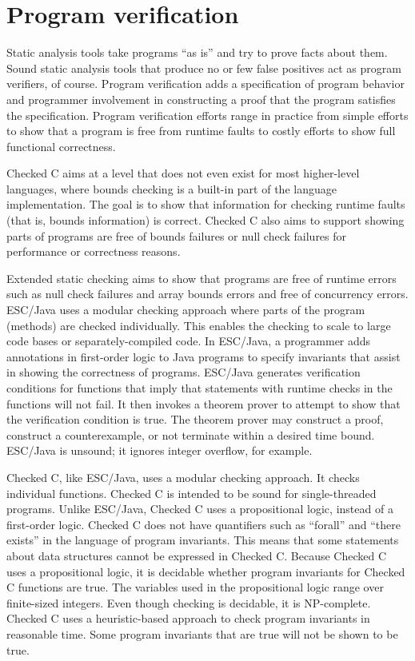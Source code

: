 \section{Program verification}

Static analysis tools take programs ``as is'' and try to prove
facts about them.  Sound static analysis tools that produce no or few false
positives act as program verifiers, of course.  Program verification 
adds a specification of program behavior and programmer involvement
in constructing a proof that the program satisfies the specification.
Program verification efforts range in practice from simple efforts to
show that a program is free from runtime faults to costly  
efforts to show full functional correctness.

Checked C aims at a level that does not even exist for most higher-level
languages, where bounds checking is a built-in part of the language
implementation.  The goal is to show that information for checking runtime
faults (that is, bounds information) is correct. Checked C also aims to
support showing parts of programs are free of bounds failures or null
check failures for performance or correctness reasons.

Extended static checking \cite{Flanagan2002} aims to show that programs are 
free of runtime errors such as null check failures and array bounds errors
and free of concurrency errors.  ESC/Java \cite{Flanagan2002}
uses a modular checking approach
where parts of the program (methods) are checked individually.  This enables 
the checking to scale to large code bases or separately-compiled code.
In ESC/Java, a programmer adds annotations in first-order logic to  Java programs to specify invariants 
that assist in showing the correctness of programs.  ESC/Java generates verification
conditions for functions that imply that statements with runtime checks in the
functions will not fail. It then invokes a theorem prover to attempt to 
show that the verification condition is true.  The theorem prover may construct
a proof, construct a counterexample, or not terminate within a desired time bound.
ESC/Java is unsound; it ignores integer overflow, for example.

Checked C, like ESC/Java, uses a modular checking approach.  It checks 
individual functions.  Checked C is intended to be sound for single-threaded 
programs.   Unlike ESC/Java, Checked C uses a propositional logic, instead
of a first-order logic.  Checked C does not have quantifiers such as ``forall''
and ``there exists'' in the language of program invariants.
This means that some statements about data structures
cannot be expressed in Checked C.  Because Checked C uses a propositional
logic, it is decidable whether program invariants for Checked C functions are true.
The variables used in the propositional logic range over finite-sized integers.
Even though checking is decidable, it is NP-complete.  Checked C uses a heuristic-based
approach to check program invariants in reasonable time. Some program invariants that
are true will not be shown to be true.

